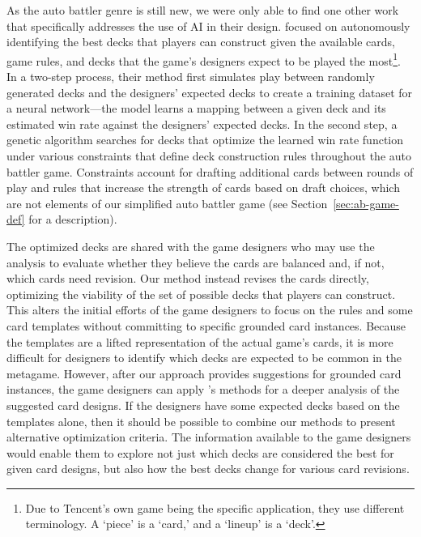 As the auto battler genre is still new, we were only able to find one other work
that specifically addresses the use of AI in their design.  \citeauthor{tencent_autobattle_lineup}
 focused on autonomously identifying the
best decks that players can construct given the available cards, game rules, and
decks that the game's designers expect to be played the most\footnote{Due to
Tencent's own game being the specific application, they use different terminology.
A `piece' is a `card,' and a `lineup' is a `deck'.}.  In a two-step process,
their method first simulates play between randomly generated decks and the designers'
expected decks to create a training dataset for a neural network---the model
learns a mapping between a given deck and its estimated win rate against the
designers' expected decks.  In the second step, a genetic algorithm searches for
decks that optimize the learned win rate function under various constraints that
define deck construction rules throughout the auto battler game.  Constraints
account for drafting additional cards between rounds of play and rules that
increase the strength of cards based on draft choices, which are not elements of
our simplified auto battler game (see Section~\ref{sec:ab-game-def} for a description).

The optimized decks are shared with the game designers who may use the
analysis to evaluate whether they believe the cards are balanced and, if not, which
cards need revision.  Our method instead revises the cards directly, optimizing
the viability of the set of possible decks that players can construct.  This alters
the initial efforts of the game designers to focus on the rules and some card templates
without committing to specific grounded card instances.  Because the templates are
a lifted representation of the actual game's cards, it is more difficult for designers
to identify which decks are expected to be common in the metagame.  However, after
our approach provides suggestions for grounded card instances, the game designers
can apply \citeauthor{tencent_autobattle_lineup}'s methods for a deeper analysis
of the suggested card designs.  If the designers have some expected decks based
on the templates alone, then it should be possible to combine our methods to
present alternative optimization criteria.  The information available to the game
designers would enable them to explore not just which decks are considered the
best for given card designs, but also how the best decks change for various card
revisions.

